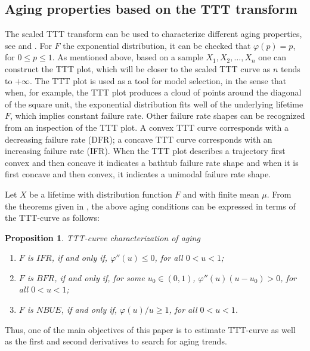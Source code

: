 \documentclass[preprint,12pt]{elsarticle}
\newtheorem{prp}{{\sc Proposition}}[section]
\begin{document}
\subsection{Aging properties based on the TTT transform}\label{sec:aging}

The scaled TTT transform can be used to characterize different aging properties, see \cite{BP75} and \cite{BK84}. For $F$ the exponential distribution, it can be checked that $\varphi(p)=p$, for $0 \leq p \leq 1$. As mentioned above, based on a sample $X_1,X_2,\ldots, X_n$ one can construct the TTT plot, which will be closer to the scaled TTT curve as $n$ tends to $+\infty$. The TTT plot is used as a tool for model selection, in the sense that when, for example, the TTT plot produces a cloud of points around the diagonal of the square  unit, the exponential distribution fits well of the underlying lifetime $F$, which implies constant failure rate. 
Other failure rate shapes can be recognized from an inspection of the TTT plot. A convex TTT curve corresponds with a decreasing failure rate (DFR); a concave TTT curve corresponds with an increasing failure rate (IFR). When the TTT plot describes a trajectory first convex and then concave it indicates a bathtub failure rate shape and when it is first concave and then convex, it indicates a unimodal failure rate shape. 

Let $X$ be a lifetime with distribution function $F$ and with finite mean $\mu$. From the theorems given  in \cite{Klefsjo83a}, the above aging conditions can be expressed in terms of the TTT-curve as follows:
\begin{prp} {TTT-curve characterization of aging} \

\begin{enumerate}
\item $ F$ is $ IFR$, if and only if, $ \varphi'' (u) \leq  0$, for all $0 <u <1$;
\item $F$ is $BFR$, if and only if, for some $u_0 \in (0,1)$, $\varphi'' (u) (u-u_0) >0 $, for all $0 <u <1$;
\item $F$ is $ NBUE$, if and only if, $\varphi(u)/u \geq  1$, for all $0 <u <1$.
\end{enumerate}
 \end{prp}

Thus, one of the main objectives of this paper is to estimate TTT-curve as well as  the first and second derivatives to search for aging trends.
\end{document}
